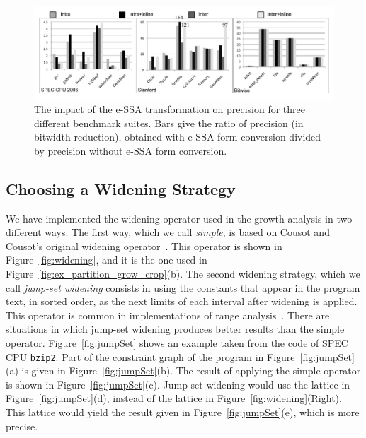 \documentclass{paper}
\begin{document}
\begin{figure}[t!]
\begin{center}
\includegraphics[width=1\textwidth]{images/precESSA}
\end{center}
\caption{\label{fig:precESSA}
The impact of the e-SSA transformation on precision for three different
benchmark suites. Bars give the ratio of precision (in bitwidth reduction),
obtained with e-SSA form conversion divided by precision without e-SSA form
conversion.}
\end{figure}

\subsection{Choosing a Widening Strategy}
\label{sub:widen}

We have implemented the widening operator used in the growth analysis in
two different ways.
The first way, which we call {\em simple}, is based on Cousot and
Cousot's original widening operator~\cite{Cousot77}.
This operator is shown in Figure~\ref{fig:widening}, and it is the one
used in Figure~\ref{fig:ex_partition_grow_crop}(b).
The second widening strategy, which we call {\em jump-set widening} consists
in using the constants that appear in the program text, in sorted order, as
the next limits of each interval after widening is applied.
This operator is common in implementations of range
analysis~\cite[p.228]{Nielson99}.
There are situations in which jump-set widening produces better results
than the simple operator.
Figure~\ref{fig:jumpSet} shows an example taken from the code of
SPEC CPU \texttt{bzip2}.
Part of the constraint graph of the program in Figure~\ref{fig:jumpSet}(a)
is given in Figure~\ref{fig:jumpSet}(b).
The result of applying the simple operator is shown in
Figure~\ref{fig:jumpSet}(c).
Jump-set widening would use the lattice in Figure~\ref{fig:jumpSet}(d),
instead of the lattice in Figure~\ref{fig:widening}(Right).
This lattice would yield the result given in Figure~\ref{fig:jumpSet}(e),
which is more precise.
\end{document}
